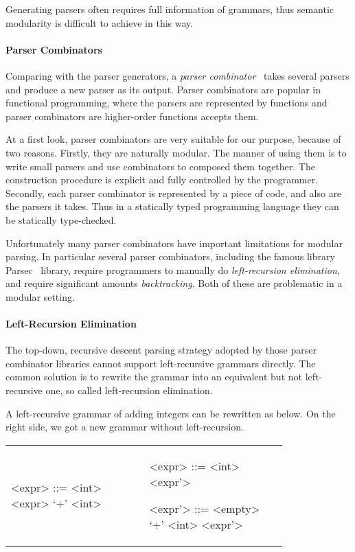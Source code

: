 Generating parsers often requires full information of grammars, thus semantic modularity is difficult to achieve in this way.


\paragraph{Parser Combinators}
Comparing with the parser generators, a \textit{parser combinator}~\cite{}
takes several parsers and produce a new parser as its output. Parser combinators are
popular in functional programming, where the parsers are represented
by functions and parser combinators are higher-order functions accepts
them.

At a first look, parser combinators are very suitable for our purpose, because of two
reasons. Firstly, they are naturally modular. The manner of using them
is to write small parsers and use combinators to composed them
together. The construction procedure is explicit and fully controlled
by the programmer. Secondly, each parser combinator is represented by
a piece of code, and also are the parsers it takes. Thus in a
statically typed programming language they can be statically
type-checked.

Unfortunately many parser combinators have important limitations for
modular parsing. In particular several parser combinators,
including the famous library Parsec~\cite{} library, require
programmers to manually do \textit{left-recursion elimination}, and
require significant amounts \textit{backtracking}. Both of these are
problematic in a modular setting.

\paragraph{Left-Recursion Elimination} The top-down, recursive descent parsing strategy adopted by those parser combinator libraries cannot support left-recursive grammars directly. The common solution is to rewrite the grammar into an equivalent but not left-recursive one, so called left-recursion elimination.

A left-recursive grammar of adding integers can be rewritten as below. On the right side, we got a new grammar without left-recursion.

\begin{tabular}{m{0.4\linewidth}m{0.4\linewidth}}
\setlength{\grammarindent}{5em}
\begin{grammar}
<expr> ::= <int> \alt <expr> `+' <int>
\end{grammar}
&
\setlength{\grammarindent}{5em}
\begin{grammar}
<expr> ::= <int> <expr'>

<expr'> ::= <empty> \alt `+' <int> <expr'>
\end{grammar}
\end{tabular}

